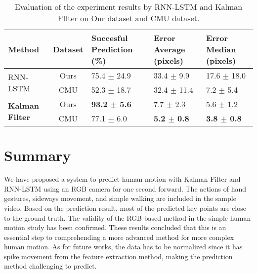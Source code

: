 \begin{table}
    \centering
    \caption{Evaluation of the experiment results by RNN-LSTM and Kalman FIlter on Our dataset and CMU dataset.}
    \begin{tabular}{|l|c|p{}|p{}|p{}|}
    \toprule
         \textbf{Method} & \textbf{Dataset} & \textbf{Succesful Prediction (\%)} & \textbf{Error Average (pixels)} & \textbf{Error Median (pixels)} \\
    \midrule
         \multirow{2}{*}{RNN-LSTM} & Ours & 75.4 $\pm$ 24.9 & 33.4 $\pm$ 9.9 & 17.6 $\pm$ 18.0 \\
         & CMU & 52.3 $\pm$ 18.7 & 32.4 $\pm$ 11.4 & 7.2 $\pm$ 5.4 \\

         \multirow{2}{*}{\textbf{Kalman Filter}} & Ours & \textbf{93.2 $\pm$ 5.6} & 7.7 $\pm$ 2.3 & 5.6 $\pm$ 1.2 \\
         & CMU & 77.1 $\pm$ 6.0 & \textbf{5.2 $\pm$ 0.8} & \textbf{3.8 $\pm$ 0.8} \\
         
    \bottomrule     
    \end{tabular}
    
    \label{tbl:2_evaluation_result}
\end{table}

\section{Summary}\label{2:summary}
We have proposed a system to predict human motion with Kalman Filter and RNN-LSTM using an RGB camera for one second forward. The actions of hand gestures, sideways movement, and simple walking are included in the sample video. Based on the prediction result, most of the predicted key points are close to the ground truth. The validity of the RGB-based method in the simple human motion study has been confirmed. These results concluded that this is an essential step to comprehending a more advanced method for more complex human motion. As for future works, the data has to be normalized since it has spike movement from the feature extraction method, making the prediction method challenging to predict. 

